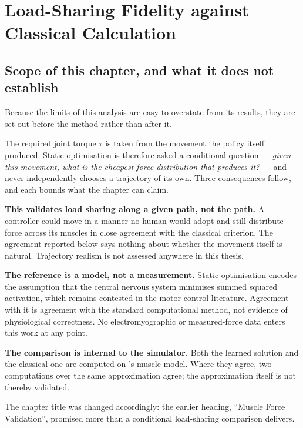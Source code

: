 
\chapter{Load-Sharing Fidelity against Classical Calculation}
\label{ch:forces}

\section{Scope of this chapter, and what it does not establish}
\label{sec:forcescope}

Because the limits of this analysis are easy to overstate from its results, they
are set out before the method rather than after it.

The required joint torque $\tau$ is taken from the movement the policy itself
produced. Static optimisation is therefore asked a conditional question ---
\emph{given this movement, what is the cheapest force distribution that produces
it?} --- and never independently chooses a trajectory of its own. Three
consequences follow, and each bounds what the chapter can claim.

\textbf{This validates load sharing along a given path, not the path.} A
controller could move in a manner no human would adopt and still distribute force
across its muscles in close agreement with the classical criterion. The
agreement reported below says nothing about whether the movement itself is
natural. Trajectory realism is not assessed anywhere in this thesis.

\textbf{The reference is a model, not a measurement.} Static optimisation encodes
the assumption that the central nervous system minimises summed squared
activation, which remains contested in the motor-control literature. Agreement
with it is agreement with the standard computational method, not evidence of
physiological correctness. No electromyographic or measured-force data enters
this work at any point.

\textbf{The comparison is internal to the simulator.} Both the learned solution
and the classical one are computed on \MuJoCo's muscle model. Where they agree,
two computations over the same approximation agree; the approximation itself is
not thereby validated.

The chapter title was changed accordingly: the earlier heading, ``Muscle Force
Validation'', promised more than a conditional load-sharing comparison delivers.

